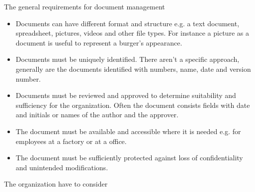 The general requirements for document management
\begin{itemize}
	\item Documents can have different format and structure e.g. a text document, spreadsheet, pictures, videos and other file types. For instance a picture as a document is useful to represent a burger's appearance. 
	\item Documents must be uniquely identified. There aren't a specific approach, generally are the documents identified with numbers, name, date and version number. 
	\item Documents must be reviewed and approved to determine suitability and sufficiency for the organization. Often the document consists fields with date and initials or names of the author and  the approver.
	\item The document must be available and accessible where it is needed e.g. for employees at a factory or at a office. 
	\item The document must be sufficiently protected against loss of confidentiality and unintended modifications. 
\end{itemize}

The organization have to consider 








